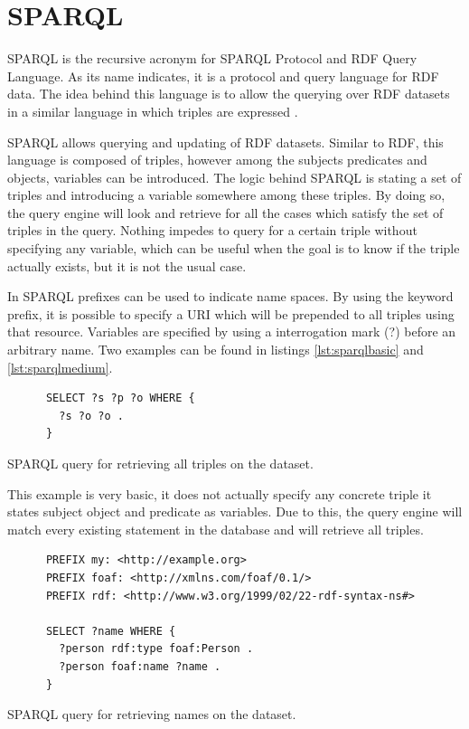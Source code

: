 \section{SPARQL}\label{sec:sparql}

SPARQL is the recursive acronym for SPARQL Protocol and RDF Query Language. As its name indicates, it is a protocol and query language for RDF data. The idea behind this language is to allow the querying over RDF datasets in a similar language in which triples are expressed \cite{sparqlprotocol}.

SPARQL allows querying \cite{sparqlquery} and updating\cite{sparqlupdate} of RDF datasets. Similar to RDF, this language is composed of triples, however among the subjects predicates and objects, variables can be introduced. The logic behind SPARQL is stating a set of triples and introducing a variable somewhere among these triples. By doing so, the query engine will look and retrieve for all the cases which satisfy the set of triples in the query. Nothing impedes to query for a certain triple without specifying any variable, which can be useful when the goal is to know if the triple actually exists, but it is not the usual case.

In SPARQL prefixes can be used to indicate name spaces. By using the keyword prefix, it is possible to specify a URI which will be prepended to all triples using that resource. Variables are specified by using a interrogation mark (?) before an arbitrary name. Two examples can be found in listings \ref{lst:sparqlbasic} and \ref{lst:sparqlmedium}.

\begin{listing}\centering
  \begin{minipage}{.6\textwidth}
    \begin{verbatim}
      SELECT ?s ?p ?o WHERE {
      	?s ?o ?o .
      }
    \end{verbatim}
  \end{minipage}
  \caption{SPARQL query for retrieving all triples on the dataset.}\label{lst:sparqlbasic}
\end{listing}

This example is very basic, it does not actually specify any concrete triple it states subject object and predicate as variables. Due to this, the query engine will match every existing statement in the database and will retrieve all triples.

\begin{listing}\centering
  \begin{minipage}{.7\textwidth}
    \begin{verbatim}
      PREFIX my: <http://example.org>
      PREFIX foaf: <http://xmlns.com/foaf/0.1/>
      PREFIX rdf: <http://www.w3.org/1999/02/22-rdf-syntax-ns#>
      
      SELECT ?name WHERE {
      	?person rdf:type foaf:Person .
      	?person foaf:name ?name .
      }
    \end{verbatim}
  \end{minipage}
  \caption{SPARQL query for retrieving names on the dataset.}\label{lst:sparqlmedium}
\end{listing}

